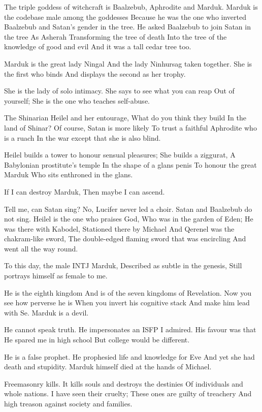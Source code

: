 \documentclass[
]{book}
\begin{document}
The triple goddess of witchcraft is
Baalzebub, Aphrodite and Marduk.
Marduk is the codebase male among the goddesses
Because he was the one who inverted
Baalzebub and Satan's gender in the tree.
He asked Baalzebub to join Satan in the tree
As Asherah
Transforming the tree of death
Into the tree of the knowledge of good and evil
And it was a tall cedar tree too.

Marduk is the great lady Ningal
And the lady Ninhursag taken together.
She is the first who binds
And displays the second as her trophy.

She is the lady of solo intimacy.
She says to see what you can reap
Out of yourself;
She is the one who teaches self-abuse.

The Shinarian Heilel and her entourage,
What do you think they build
In the land of Shinar?
Of course, Satan is more likely
To trust a faithful Aphrodite who is a ruach
In the war except that she is also blind.

Heilel builds a tower to honour sensual pleasures;
She builds a ziggurat,
A Babylonian prostitute's temple
In the shape of a glans penis
To honour the great Marduk
Who sits enthroned in the glans.

If I can destroy Marduk,
Then maybe I can ascend.

Tell me, can Satan sing?
No, Lucifer never led a choir.
Satan and Baalzebub do not sing.
Heilel is the one who praises God,
Who was in the garden of Eden;
He was there with Kabodel,
Stationed there by Michael
And Qerenel was the chakram-like sword,
The double-edged flaming sword that was encircling
And went all the way round.

To this day, the male INTJ Marduk,
Described as subtle in the genesis,
Still portrays himself as female to me.

He is the eighth kingdom
And is of the seven kingdoms of Revelation.
Now you see how perverse he is
When you invert his cognitive stack
And make him lead with Se.
Marduk is a devil.

He cannot speak truth.
He impersonates an ISFP I admired.
His favour was that
He spared me in high school
But college would be different.

He is a false prophet.
He prophesied life and knowledge for Eve
And yet she had death and stupidity.
Marduk himself died at the hands of Michael.

Freemasonry kills.
It kills souls and destroys the destinies
Of individuals and whole nations.
I have seen their cruelty;
These ones are guilty of treachery
And high treason against society and families.
\end{document}
